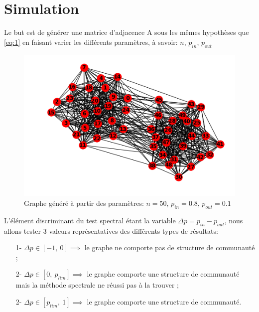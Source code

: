 \section{Simulation}
Le but est de générer une matrice d'adjacence A sous les mêmes hypothèses que \eqref{eq:1} en faisant varier les différents paramètres, à savoir: $n$, $p_{in}$, $p_{out}$ \\

\begin{figure}[H]
\centering
\includegraphics[scale=0.6]{static/graph_n50_pin08_pout01.png}
\caption{Graphe généré à partir des paramètres: $n=50$, $p_{in}=0.8$, $p_{out}=0.1$}
\end{figure}

L'élément discriminant du test spectral étant la variable $ \Delta p= p_{in} - p_{out}$, nous allons tester 3 valeurs représentatives des différents types de résultats:
\begin{itemize}
	\item[1-] $\Delta p \in [-1,\: 0] \implies$ le graphe ne comporte pas de structure de communauté ;
	\item[2-] $\Delta p \in [0,\: p_{lim}] \implies$ le graphe comporte une structure de communauté mais la méthode spectrale ne réussi pas à la trouver ;
	\item[2-] $\Delta p \in [p_{lim},\: 1] \implies$ le graphe comporte une structure de communauté.\\
\end{itemize}

